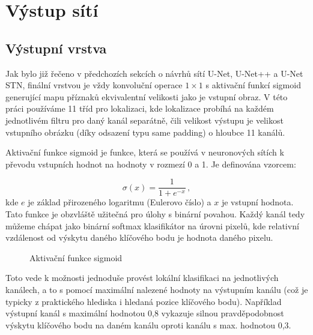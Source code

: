 \section{Výstup sítí}
\label{sec:Chapter46}
\subsection{Výstupní vrstva}
Jak bylo již řečeno v předchozích sekcích o návrhů sítí U-Net, U-Net++ a U-Net STN, finální vrstvou je vždy konvoluční operace $1\times1$ s aktivační funkcí sigmoid generující mapu příznaků ekvivalentní velikosti jako je vstupní obraz. V této práci používáme 11 tříd pro lokalizaci, kde lokalizace probíhá na každém jednotlivém filtru pro daný kanál separátně, čili velikost výstupu je velikost vstupního obrázku (díky odsazení typu same padding) o hloubce 11 kanálů.

Aktivační funkce sigmoid je funkce, která se používá v neuronových sítích k převodu vstupních hodnot na hodnoty v rozmezí 0 a 1. Je definována vzorcem:

\begin{equation}
\sigma(x) = \frac{1}{1+e^{-x}}\,,
\end{equation}
kde $e$ je základ přirozeného logaritmu (Eulerovo číslo) a $x$ je vstupní hodnota. Tato funkce je obzvláště užitečná pro úlohy s binární povahou. Každý kanál tedy můžeme chápat jako binární softmax klasifikátor na úrovni pixelů, kde relativní vzdálenost od výskytu daného klíčového bodu je hodnota daného pixelu.

\begin{figure}[H]
    \centering
    \caption[Aktivační funkce sigmoid]{Aktivační funkce sigmoid}
    \label{fig:sigmoid}
\end{figure}

Toto vede k možnosti jednoduše provést lokální klasifikaci na jednotlivých kanálech, a to s pomocí maximální nalezené hodnoty na výstupním kanálu (což je typicky z praktického hlediska i hledaná pozice klíčového bodu). Například výstupní kanál s maximální hodnotou 0,8 vykazuje silnou pravděpodobnost výskytu klíčového bodu na daném kanálu oproti kanálu s max. hodnotou 0,3.

